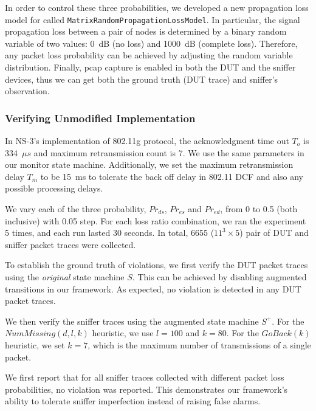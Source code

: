 In order to control these three probabilities, we developed a new propagation
loss model for \ns{} called \texttt{MatrixRandomPropagationLossModel}. In
particular, the signal propagation loss between a pair of nodes is determined by
a binary random variable of two values: 0~dB (no loss) and 1000~dB (complete
loss).  Therefore, any packet loss probability can be achieved by adjusting the
random variable distribution. Finally, pcap capture is enabled in both the DUT
and the sniffer devices, thus we can get both the ground truth (DUT trace) and
sniffer's observation.


\subsubsection{Verifying Unmodified Implementation}

In NS-3's implementation of 802.11g protocol, the acknowledgment time out $T_o$
is 334~$\mu s$ and maximum retransmission count is 7.  We use the same
parameters in our monitor state machine.  Additionally, we set the maximum
retransmission delay $T_m$ to be 15~ms to tolerate the back off delay in 802.11
DCF and also any possible processing delays.


We vary each of the three probability, $Pr_{ds}$, $Pr_{es}$ and $Pr_{ed}$, from
0 to 0.5 (both inclusive) with 0.05 step.  For each loss ratio combination, we
ran the experiment 5 times, and each run lasted
30 seconds.  In total, 6655 ($11^3\times 5$) pair of DUT and sniffer packet
   traces were collected.

To establish the ground truth of violations, we first verify the DUT packet
traces using the \textit{original} state machine $S$.  This can be achieved by
disabling augmented transitions in our framework.  As expected, no violation is
detected in any DUT packet traces.

We then verify the sniffer traces using the augmented state machine $S^+$.  For
the $NumMissing(d, l, k)$ heuristic, we use $l=100$ and $k=80$.
For the $GoBack(k)$ heuristic, we set $k=7$, which is the maximum number of
transmissions of a single packet.

We first report that for all sniffer traces collected with different packet loss
probabilities, no violation was reported.  This demonstrates our framework's
ability to tolerate sniffer imperfection instead of raising false alarms. 


